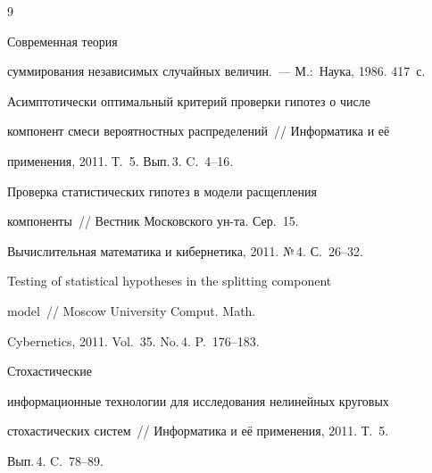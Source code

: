 {\small\frenchspacing

{%


\begin{thebibliography}{9}






 Современная теория

суммирования независимых случайных величин.~--- М.:~Наука, 1986. 417~с.



 

Асимптотически оптимальный критерий проверки гипотез о числе

компонент смеси вероятностных распределений~/\!\!/ Информатика и её

применения, 2011. Т.~5. Вып.\,3. C.~4--16.





Проверка статистических гипотез в модели расщепления

компоненты~/\!\!/ Вестник Московского ун-та. Сер.~15.

Вычислительная математика и кибернетика, 2011. №\,4. С.~26--32.





Testing of statistical hypotheses in the splitting component

model~/\!\!/ Moscow University Comput. Math.

Cybernetics, 2011. Vol.~35. No.\,4. P.~176--183.



\label{end\stat}




 Стохастические

информационные технологии для исследования нелинейных круговых

стохастических систем~/\!\!/ Информатика и её применения, 2011. Т.~5.

Вып.\,4. C.~78--89.

 \end{thebibliography}

}

}

